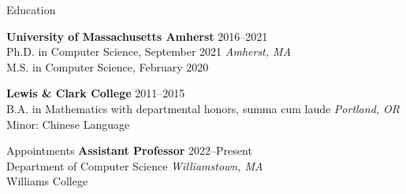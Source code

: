 \documentclass{resume} %
\begin{document}
%


\begin{rSection}{Education}

{\bf University of Massachusetts Amherst} \hfill {2016--2021} \\ 
Ph.D. in Computer Science, September 2021 \hfill {\em Amherst, MA} \\
M.S. in Computer Science, February 2020
 

{\bf Lewis \& Clark College} \hfill {2011--2015} \\ 
B.A. in Mathematics with departmental honors, summa cum laude \hfill {\em Portland, OR} \\
Minor: Chinese Language\\
\end{rSection}

\begin{rSection}{Appointments}
{\bf Assistant Professor} \hfill {2022--Present} \\
Department of Computer Science \hfill {\em Williamstown, MA} \\ 
 Williams College
\end{rSection}

\end{document}
